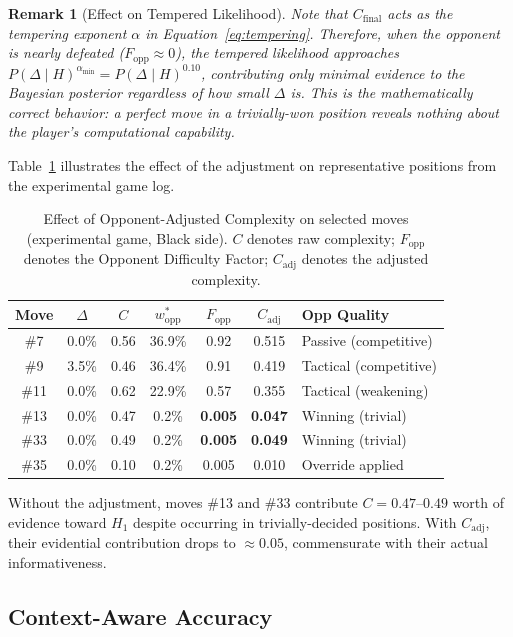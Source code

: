 \documentclass[11pt,a4paper]{article}
\newtheorem{remark}{Remark}
\begin{document}
\begin{remark}[Effect on Tempered Likelihood]
Note that $C_{\text{final}}$ acts as the tempering exponent $\alpha$ in
Equation~\eqref{eq:tempering}. Therefore, when the opponent is nearly
defeated ($F_{\text{opp}} \approx 0$), the tempered likelihood approaches
$P(\Delta \mid H)^{\alpha_{\min}} = P(\Delta \mid H)^{0.10}$, contributing
only minimal evidence to the Bayesian posterior regardless of how small $\Delta$
is. This is the mathematically correct behavior: a perfect move in a
trivially-won position reveals nothing about the player's computational
capability.
\end{remark}

Table~\ref{tab:opp_example} illustrates the effect of the adjustment on
representative positions from the experimental game log.

\begin{table}[H]
\centering
\caption{Effect of Opponent-Adjusted Complexity on selected moves
(experimental game, Black side). $C$ denotes raw complexity;
$F_{\text{opp}}$ denotes the Opponent Difficulty Factor;
$C_{\text{adj}}$ denotes the adjusted complexity.}
\label{tab:opp_example}
\begin{tabular}{ccccccl}
\toprule
Move & $\Delta$ & $C$ & $w^*_{\text{opp}}$ & $F_{\text{opp}}$ &
$C_{\text{adj}}$ & Opp Quality \\
\midrule
\#7  & 0.0\% & 0.56 & 36.9\% & 0.92 & 0.515 & Passive (competitive) \\
\#9  & 3.5\% & 0.46 & 36.4\% & 0.91 & 0.419 & Tactical (competitive) \\
\#11 & 0.0\% & 0.62 & 22.9\% & 0.57 & 0.355 & Tactical (weakening) \\
\#13 & 0.0\% & 0.47 & 0.2\%  & \textbf{0.005} & \textbf{0.047} & Winning (trivial) \\
\#33 & 0.0\% & 0.49 & 0.2\%  & \textbf{0.005} & \textbf{0.049} & Winning (trivial) \\
\#35 & 0.0\% & 0.10 & 0.2\%  & 0.005 & 0.010 & Override applied \\
\bottomrule
\end{tabular}
\end{table}

Without the adjustment, moves \#13 and \#33 contribute $C = 0.47$--$0.49$
worth of evidence toward $H_1$ despite occurring in trivially-decided
positions. With $C_{\text{adj}}$, their evidential contribution drops to
$\approx 0.05$, commensurate with their actual informativeness.

\subsection{Context-Aware Accuracy}
\end{document}
